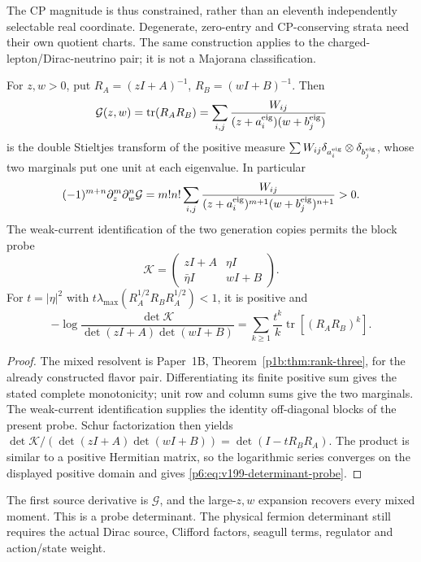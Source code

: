\documentclass[12pt,a4paper]{article}
\begin{document}
The CP magnitude is thus constrained, rather than an eleventh independently
selectable real coordinate.  Degenerate, zero-entry and CP-conserving strata
need their own quotient charts.  The same construction applies to the
charged-lepton/Dirac-neutrino pair; it is not a Majorana classification.

\begin{proposition}
\label{p6:prop:v199-mixed-resolvent}
For \(z,w>0\), put \(R_A=(zI+A)^{-1}\), \(R_B=(wI+B)^{-1}\).
Then
\begin{equation}
 \mathcal G(z,w)=\operatorname{tr}(R_AR_B)
 =\sum_{i,j}\frac{W_{ij}}{(z+a_i^{\rm eig})(w+b_j^{\rm eig})}
 \label{p6:eq:v199-mixed-stieltjes}
\end{equation}
is the double Stieltjes transform of the positive measure
\(\sum W_{ij}\delta_{a_i^{\rm eig}}\otimes\delta_{b_j^{\rm eig}}\),
whose two marginals put one unit at each eigenvalue.  In particular
\[
 (-1)^{m+n}\partial_z^m\partial_w^n\mathcal G
 =m!n!\sum_{i,j}\frac{W_{ij}}
 {(z+a_i^{\rm eig})^{m+1}(w+b_j^{\rm eig})^{n+1}}>0.
\]
The weak-current identification of the two generation copies permits the
block probe
\[
 \mathcal K=\begin{pmatrix}zI+A&\eta I\\\bar\eta I&wI+B\end{pmatrix}.
\]
For \(t=|\eta|^2\) with
\(t\lambda_{\max}(R_A^{1/2}R_BR_A^{1/2})<1\), it is positive and
\begin{equation}
 -\log\frac{\det\mathcal K}{\det(zI+A)\det(wI+B)}
 =\sum_{k\ge1}\frac{t^k}{k}\operatorname{tr}[(R_AR_B)^k].
 \label{p6:eq:v199-determinant-probe}
\end{equation}
\end{proposition}
\begin{proof}
The mixed resolvent is Paper~1B, Theorem~\ref{p1b:thm:rank-three},
for the already constructed flavor pair. Differentiating its finite
positive sum gives the stated complete monotonicity; unit row and
column sums give the two marginals. The weak-current identification
supplies the identity off-diagonal blocks of the present probe.
Schur factorization then yields
$\det\mathcal K/(\det(zI+A)\det(wI+B))=\det(I-tR_BR_A)$.
The product is similar to a positive Hermitian matrix, so the logarithmic
series converges on the displayed positive domain and gives
\eqref{p6:eq:v199-determinant-probe}.
\end{proof}
The first source derivative is \(\mathcal G\), and the large-\(z,w\)
expansion recovers every mixed moment.  This is a probe determinant.  The
physical fermion determinant still requires the actual Dirac source,
Clifford factors, seagull terms, regulator and action/state weight.
\end{document}
